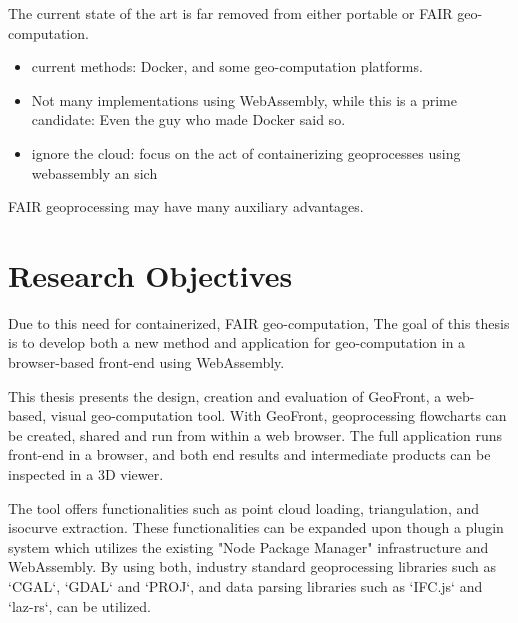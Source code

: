 The current state of the art is far removed from either portable or FAIR geo-computation. 
\begin{itemize}
  \item current methods: Docker, and some geo-computation platforms.
  \item Not many implementations using WebAssembly, while this is a prime candidate: Even the guy who made Docker said so. 
  \item ignore the cloud: focus on the act of containerizing geoprocesses using webassembly an sich
\end{itemize}

FAIR geoprocessing may have many auxiliary advantages. 



\section{Research Objectives}


Due to this need for containerized, FAIR geo-computation, The goal of this thesis is to develop both a new method and application for geo-computation in a browser-based front-end using WebAssembly.

This thesis presents the design, creation and evaluation of GeoFront, a web-based, visual geo-computation tool. 
With GeoFront, geoprocessing flowcharts can be created, shared and run from within a web browser.  
The full application runs front-end in a browser, and both end results and intermediate products can be inspected in a 3D viewer.

The tool offers functionalities such as point cloud loading, triangulation, and isocurve extraction.
These functionalities can be expanded upon though a plugin system which utilizes the existing "Node Package Manager" infrastructure and WebAssembly.
By using both, industry standard geoprocessing libraries such as `CGAL`, `GDAL` and `PROJ`, and data parsing libraries such as `IFC.js` and `laz-rs`, can be utilized.

